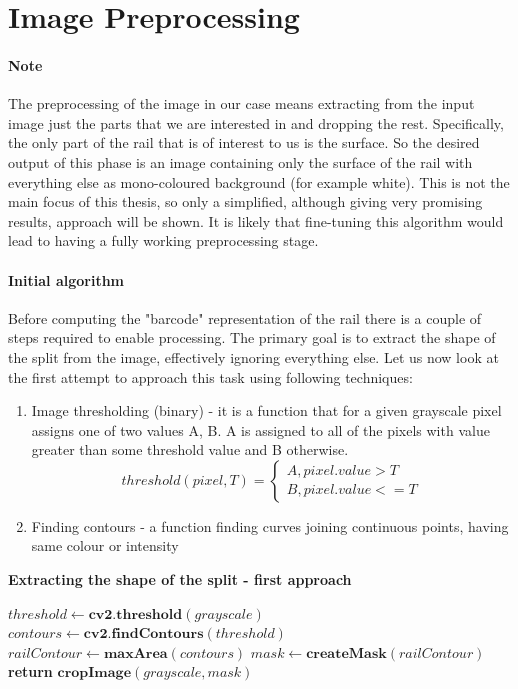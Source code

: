 \section{Image Preprocessing}
\paragraph{Note}
The preprocessing of the image in our case means extracting from the input image just the parts that we are interested in and dropping the rest. Specifically, the only part of the rail that is of interest to us is the surface. So the desired output of this phase is an image containing only the surface of the rail with everything else as mono-coloured background (for example white). This is not the main focus of this thesis, so only a simplified, although giving very promising results, approach will be shown. It is likely that fine-tuning this algorithm would lead to having a fully working preprocessing stage.

\paragraph{Initial algorithm}
Before computing the "barcode" representation of the rail there is a couple of steps required to enable processing. The primary goal is to extract the shape of the split from the image, effectively ignoring everything else. Let us now look at the first attempt to approach this task using following techniques:

\begin{enumerate}
	\item Image thresholding (binary) - it is a function that for a given grayscale pixel assigns one of two values {A, B}. A is assigned to all of the pixels with value greater than some threshold value and B otherwise.
	$$
	threshold (pixel, T) = \begin{cases}
		A, pixel.value > T \\
		B, pixel.value <= T
	\end{cases}
	$$
	\item Finding contours - a function finding curves joining continuous points, having same colour or intensity
\end{enumerate}

\begin{algorithm}{\textbf{Extracting the shape of the split - first approach}}
	\begin{spacing}{1.5}
	\begin{algorithmic}[1]
			\State $threshold \gets \textbf{cv2.threshold}(grayscale)$
			\State $contours \gets \textbf{cv2.findContours}(threshold)$
			\State $railContour \gets \textbf{maxArea}(contours)$
			\State $mask \gets \textbf{createMask}(railContour)$
			\State \textbf{return} $\textbf{cropImage}(grayscale, mask)$
		\EndFunction
	\end{algorithmic}
	\end{spacing}
\end{algorithm}

